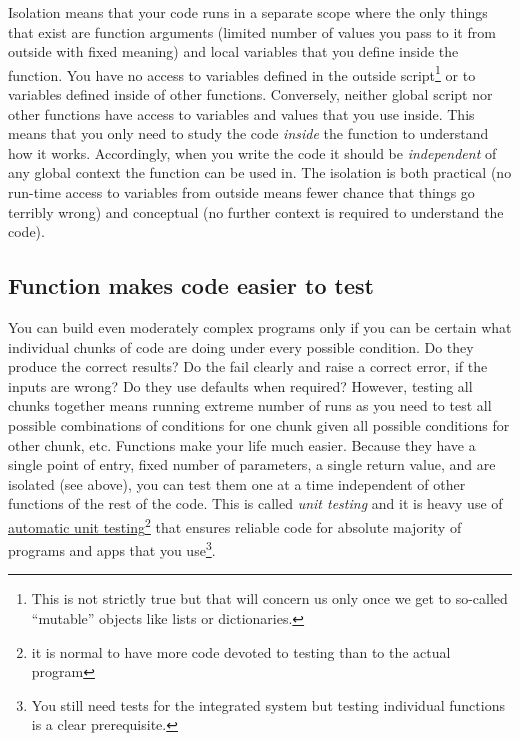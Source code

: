 \documentclass[
]{book}
\begin{document}
Isolation means that your code runs in a separate scope where the only things that exist are function arguments (limited number of values you pass to it from outside with fixed meaning) and local variables that you define inside the function. You have no access to variables defined in the outside script\footnote{This is not strictly true but that will concern us only once we get to so-called ``mutable'' objects like lists or dictionaries.} or to variables defined inside of other functions. Conversely, neither global script nor other functions have access to variables and values that you use inside. This means that you only need to study the code \emph{inside} the function to understand how it works. Accordingly, when you write the code it should be \emph{independent} of any global context the function can be used in. The isolation is both practical (no run-time access to variables from outside means fewer chance that things go terribly wrong) and conceptual (no further context is required to understand the code).

\hypertarget{function-makes-code-easier-to-test}{%
\subsection{Function makes code easier to test}\label{function-makes-code-easier-to-test}}

You can build even moderately complex programs only if you can be certain what individual chunks of code are doing under every possible condition. Do they produce the correct results? Do the fail clearly and raise a correct error, if the inputs are wrong? Do they use defaults when required? However, testing all chunks together means running extreme number of runs as you need to test all possible combinations of conditions for one chunk given all possible conditions for other chunk, etc. Functions make your life much easier. Because they have a single point of entry, fixed number of parameters, a single return value, and are isolated (see above), you can test them one at a time independent of other functions of the rest of the code. This is called \emph{unit testing} and it is heavy use of \href{https://docs.python.org/3/library/unittest.html}{automatic unit testing}\footnote{it is normal to have more code devoted to testing than to the actual program} that ensures reliable code for absolute majority of programs and apps that you use\footnote{You still need tests for the integrated system but testing individual functions is a clear prerequisite.}.
\end{document}

